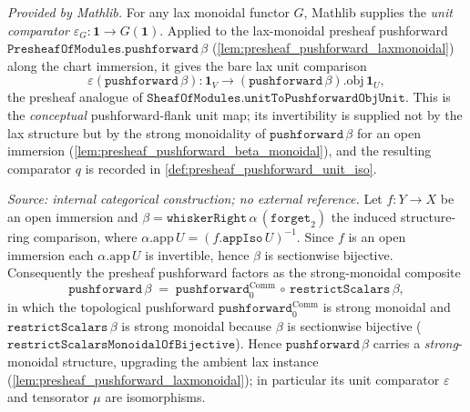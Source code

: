 \begin{definition}
  \label{def:presheaf_pushforward_unit_eps}
  \mathlibok
  \textit{Provided by Mathlib.}
  For any lax monoidal functor \(G\), Mathlib supplies the \emph{unit comparator}
  \(\varepsilon_G : \mathbf 1 \to G(\mathbf 1)\). Applied to the lax-monoidal presheaf pushforward
  \(\mathtt{PresheafOfModules.pushforward}\,\beta\) (\cref{lem:presheaf_pushforward_laxmonoidal}) along
  the chart immersion, it gives the bare lax unit comparison
  \[
    \varepsilon(\mathtt{pushforward}\,\beta) :
      \mathbf 1_V \longrightarrow (\mathtt{pushforward}\,\beta).\mathrm{obj}\,\mathbf 1_U ,
  \]
  the presheaf analogue of \(\mathtt{SheafOfModules.unitToPushforwardObjUnit}\). This is the
  \emph{conceptual} pushforward-flank unit map; its invertibility is supplied not by the lax
  structure but by the strong monoidality of \(\mathtt{pushforward}\,\beta\) for an open immersion
  (\cref{lem:presheaf_pushforward_beta_monoidal}), and the resulting comparator \(q\) is recorded in
  \cref{def:presheaf_pushforward_unit_iso}.
\end{definition}

\begin{lemma}\leanok
  \label{lem:presheaf_pushforward_beta_monoidal}
  \textit{Source: internal categorical construction; no external reference.}
  Let \(f : Y \to X\) be an open immersion and \(\beta = \mathtt{whiskerRight}\,\alpha\,
  (\mathtt{forget}_2)\) the induced structure-ring comparison, where
  \(\alpha.\mathrm{app}\,U = (f.\mathtt{appIso}\,U)^{-1}\). Since \(f\) is an open immersion each
  \(\alpha.\mathrm{app}\,U\) is invertible, hence \(\beta\) is sectionwise bijective. Consequently the
  presheaf pushforward factors as the strong-monoidal composite
  \[
    \mathtt{pushforward}\,\beta \;=\;
      \mathtt{pushforward}_0^{\mathrm{Comm}} \,\circ\, \mathtt{restrictScalars}\,\beta ,
  \]
  in which the topological pushforward \(\mathtt{pushforward}_0^{\mathrm{Comm}}\) is strong monoidal
  and \(\mathtt{restrictScalars}\,\beta\) is strong monoidal because \(\beta\) is sectionwise
  bijective (\(\mathtt{restrictScalarsMonoidalOfBijective}\)). Hence \(\mathtt{pushforward}\,\beta\)
  carries a \emph{strong}-monoidal structure, upgrading the ambient lax instance
  (\cref{lem:presheaf_pushforward_laxmonoidal}); in particular its unit comparator
  \(\varepsilon\) and tensorator \(\mu\) are isomorphisms.
\end{lemma}

